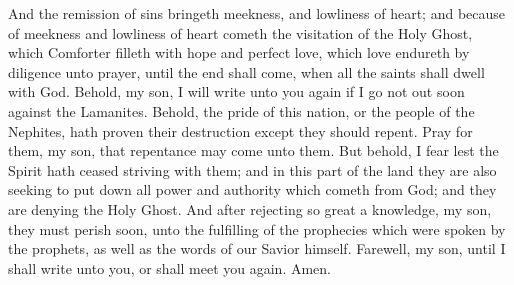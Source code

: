 And the remission of sins bringeth meekness, and lowliness of heart; and because of meekness and lowliness of heart cometh the visitation of the Holy Ghost, which Comforter filleth with hope and perfect love, which love endureth by diligence unto prayer, until the end shall come, when all the saints shall dwell with God.
\bverse \iffalse Behold, my son, I will write unto you again if I go not out soon against the Lamanites. Behold, the pride of this nation, or the people of the Nephites, hath proven their destruction except they should repent. \fi
Behold, my son, I will write unto you again if I go not out soon against the Lamanites. Behold, the pride of this nation, or the people of the Nephites, hath proven their destruction except they should repent.
\bverse \iffalse Pray for them, my son, that repentance may come unto them.  But behold, I fear lest the Spirit hath ceased striving with them; and in this part of the land they are also seeking to put down all power and authority which cometh from God; and they are denying the Holy Ghost. \fi
Pray for them, my son, that repentance may come unto them.  But behold, I fear lest the Spirit hath ceased striving with them; and in this part of the land they are also seeking to put down all power and authority which cometh from God; and they are denying the Holy Ghost.
\bverse \iffalse And after rejecting so great a knowledge, my son, they must perish soon, unto the fulfilling of the prophecies which were spoken by the prophets, as well as the words of our Savior himself. \fi
And after rejecting so great a knowledge, my son, they must perish soon, unto the fulfilling of the prophecies which were spoken by the prophets, as well as the words of our Savior himself.
\bverse \iffalse Farewell, my son, until I shall write unto you, or shall meet you again. Amen. \fi
Farewell, my son, until I shall write unto you, or shall meet you again. Amen.

